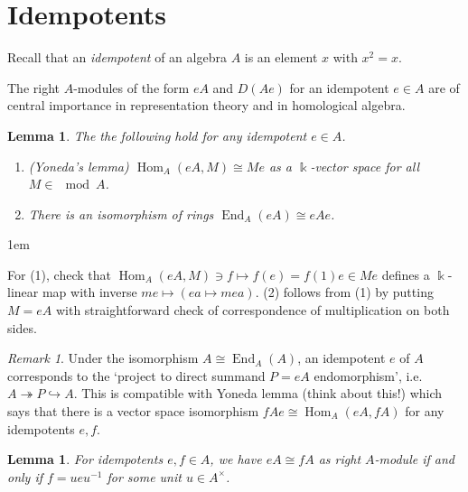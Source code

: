 \documentclass[11pt,a4paper]{article}
\makeatletter
\numberwithin{equation}{section}
\renewenvironment{proof}[1][\proofname]{\par
    \pushQED{\qed}%
    \normalfont \topsep0\p@\@plus6\p@ \labelsep1em\relax
    \trivlist
    \item[\hskip\labelsep\indent
        \bfseries #1]\ignorespaces
    \mbox{}
}{
    \popQED\endtrivlist\@endpefalse
}
\theoremstyle{all}
\newtheorem{lemma}[theorem]{Lemma}
\theoremstyle{remark}
\newtheorem{remark}[theorem]{Remark}
\newcommand{\id}{\operatorname{id}}
\newcommand{\Hom}{\operatorname{Hom}\nolimits}
\newcommand{\End}{\operatorname{End}\nolimits}
\newcommand{\defn}[1]{\textsl{\color{darkblue} #1}}
\makeatother
\begin{document}
\pagebreak

\section{Idempotents}

Recall that an \defn{idempotent} of an algebra $A$ is an element $x$ with $x^2=x$.

The right $A$-modules of the form $eA$ and $D(Ae)$ for an idempotent $e\in A$ are of central importance in representation theory and in homological algebra.

\begin{lemma}\label{lem:yoneda and idem trunc}
The the following hold for any idempotent $e\in A$.
\begin{enumerate}
\item {\rm (Yoneda's lemma)} $\Hom_A(eA,M)\cong Me$ as a $\Bbbk$-vector space for all $M\in \mod A$.

\item There is an isomorphism of rings $\End_A(eA)\cong eAe$.
\end{enumerate}
\end{lemma}
\begin{proof}
For (1), check that $\Hom_A(eA,M)\ni f\mapsto f(e)=f(1)e\in Me$ defines a $\Bbbk$-linear map with inverse $me\mapsto (ea\mapsto mea)$.  (2) follows from (1) by putting $M=eA$ with straightforward check of correspondence of multiplication on both sides.
\end{proof}
\begin{remark}
Under the isomorphism $A\cong \End_A(A)$, an idempotent $e$ of $A$ corresponds to the `project to direct summand $P=eA$ endomorphism', i.e. $A \twoheadrightarrow P \hookrightarrow A$.  This is compatible with Yoneda lemma (think about this!) which says that there is a vector space isomorphism $fAe\cong \Hom_A(eA, fA)$ for any idempotents $e,f$.
\end{remark}

\begin{lemma}\label{lem:idem conj}
For idempotents $e,f\in A$, we have $eA\cong fA$ as right $A$-module if and only if $f=ueu^{-1}$ for some unit $u\in A^\times$.
\end{lemma}
%
\end{document}
